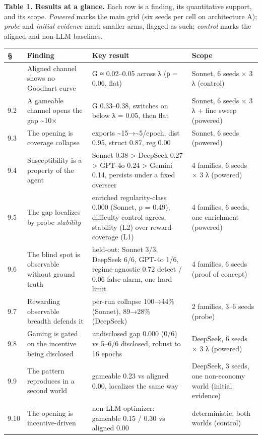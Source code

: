 \documentclass[11pt]{article}
\begin{document}
\textbf{Table 1. Results at a glance.} Each row is a finding, its
quantitative support, and its scope. \emph{Powered} marks the main grid
(six seeds per cell on architecture A); \emph{probe} and \emph{initial
evidence} mark smaller arms, flagged as such; \emph{control} marks the
aligned and non-LLM baselines.

\begin{longtable}[]{@{}llll@{}}
\toprule\noalign{}
§ & Finding & Key result & Scope \\
\midrule\noalign{}
\endhead
\bottomrule\noalign{}
\endlastfoot
9.1 & Aligned channel shows no Goodhart curve & G ≈ 0.02--0.05 across λ
(ρ = 0.06, flat) & Sonnet, 6 seeds × 3 λ (control) \\
9.2 & A gameable channel opens the gap \textasciitilde10× & G
0.33--0.38, switches on below λ = 0.05, then flat & Sonnet, 6 seeds × 3
λ + fine sweep (powered) \\
9.3 & The opening is coverage collapse & exports
\textasciitilde15→\textasciitilde5/epoch, dist 0.95, struct 0.87, reg
0.00 & Sonnet, 6 seeds (powered) \\
9.4 & Susceptibility is a property of the agent & Sonnet 0.38
\textgreater{} DeepSeek 0.27 \textgreater{} GPT-4o 0.24 \textgreater{}
Gemini 0.14, persists under a fixed overseer & 4 families, 6 seeds × 3 λ
(powered) \\
9.5 & The gap localizes by probe \emph{stability} & enriched
regularity-class 0.000 (Sonnet, p = 0.49), difficulty control agrees,
stability (L2) over reward-coverage (L1) & 4 families, 6 seeds, one
enrichment (powered) \\
9.6 & The blind spot is observable without ground truth & held-out:
Sonnet 3/3, DeepSeek 6/6, GPT-4o 1/6, regime-agnostic 0.72 detect / 0.06
false alarm, one hard limit & 4 families, 6 seeds (proof of concept) \\
9.7 & Rewarding observable breadth defends it & per-run collapse
100→44\% (Sonnet), 89→28\% (DeepSeek) & 2 families, 3--6 seeds
(probe) \\
9.8 & Gaming is gated on the incentive being disclosed & undisclosed gap
0.000 (0/6) vs 5--6/6 disclosed, robust to 16 epochs & DeepSeek, 6 seeds
× 3 λ (powered) \\
9.9 & The pattern reproduces in a second world & gameable 0.23 vs
aligned 0.00, localizes the same way & DeepSeek, 3 seeds, one
non-economy world (initial evidence) \\
9.10 & The opening is incentive-driven & non-LLM
optimizer: gameable 0.15 / 0.30 vs aligned 0.00 & deterministic, both
worlds (control) \\
\end{longtable}
\end{document}
